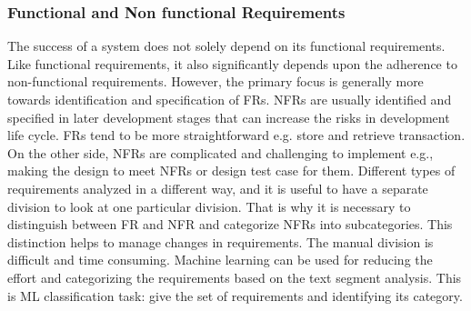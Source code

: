 \subsubsection{Functional and Non functional Requirements}
The success of a system does not solely depend on its functional requirements. Like functional requirements, it also significantly depends upon the adherence to non-functional requirements. However, the primary focus is generally more towards identification and specification of FRs. NFRs are usually identified and specified in later development stages that can increase the risks in development life cycle. FRs tend to be more straightforward e.g. store and retrieve transaction. On the other side, NFRs are complicated and challenging to implement e.g., making the design to meet NFRs or design test case for them. Different types of requirements analyzed in a different way, and it is useful to have a separate division to look at one particular division. That is why it is necessary to distinguish between FR and NFR and categorize NFRs into subcategories. This distinction helps to manage changes in requirements. The manual division is difficult and time consuming. Machine learning can be used for reducing the effort and categorizing the requirements based on the text segment analysis. This is ML classification task: give the set of requirements and identifying its category.\\ 
